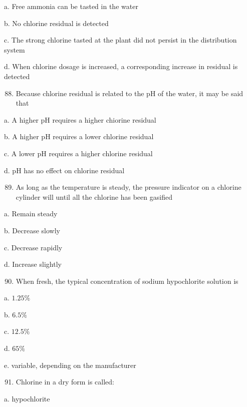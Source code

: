 \documentclass[10pt]{article}
\begin{document}
\begin{enumerate}
\begin{enumerate}
a. Free ammonia can be tasted in the water

b. No chlorine residual is detected

c. The strong chlorine tasted at the plant did not persist in the distribution system

d. When chlorine dosage is increased, a corresponding increase in residual is detected

\begin{enumerate}
  \setcounter{enumi}{87}
  \item Because chlorine residual is related to the $\mathrm{pH}$ of the water, it may be said that
\end{enumerate}

a. A higher $\mathrm{pH}$ requires a higher chiorine residual

b. A higher $\mathrm{pH}$ requires a lower chlorine residual

c. A lower $\mathrm{pH}$ requires a higher chlorine residual

d. $\mathrm{pH}$ has no effect on chlorine residual

\begin{enumerate}
  \setcounter{enumi}{88}
  \item As long as the temperature is steady, the pressure indicator on a chlorine cylinder will until all the chlorine has been gasified
\end{enumerate}

a. Remain steady

b. Decrease slowly

c. Decrease rapidly

d. Increase slightly

\begin{enumerate}
  \setcounter{enumi}{89}
  \item When fresh, the typical concentration of sodium hypochlorite solution is
\end{enumerate}

a. $1.25 \%$

b. $6.5 \%$

c. $12.5 \%$

d. $65 \%$

e. variable, depending on the manufacturer

\begin{enumerate}
  \setcounter{enumi}{90}
  \item Chlorine in a dry form is called:
\end{enumerate}

a. hypochlorite


\end{enumerate}
\end{enumerate}
\end{document}

